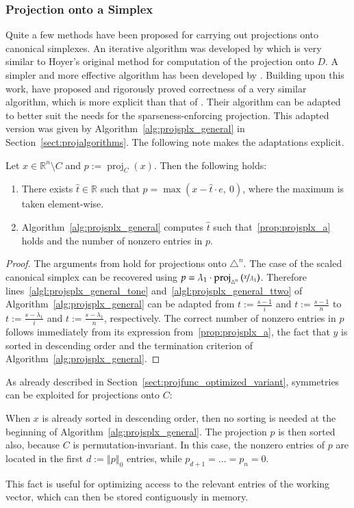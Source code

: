 \documentclass[twoside,11pt]{article}
\DeclareMathOperator{\proj}{proj}
\newcommand{\R}{\mathbb{R}}
\newcommand{\0}{\mathcal{O}}
\newcommand{\norm}[1]{\left\Vert#1\right\Vert}
\newcommand{\splx}{\triangle}
\begin{document}
\subsubsection{Projection onto a Simplex}
Quite a few methods have been proposed for carrying out projections onto canonical simplexes.
An iterative algorithm was developed by \cite{Michelot1986} which is very similar to Hoyer's original method for computation of the projection onto $D$.
A simpler and more effective algorithm has been developed by \cite{Duchi2008}.
Building upon this work, \cite{Chen2011} have proposed and rigorously proved correctness of a very similar algorithm, which is more explicit than that of \cite{Duchi2008}.
Their algorithm can be adapted to better suit the needs for the sparseness-enforcing projection.
This adapted version was given by Algorithm~\ref{alg:projsplx_general} in Section~\ref{sect:projalgorithms}.
The following note makes the adaptations explicit.
\begin{proposition}
\label{prop:projsplx}
Let $x\in\R^n\setminus C$ and $p := \proj_C(x)$.
Then the following holds:
\begin{enumerate}
\item \label{prop:projsplx_a}
There exists $\hat{t}\in\R$ such that $p = \max\left(x - \hat{t}\cdot e,\ 0\right)$, where the maximum is taken element-wise.
\item \label{prop:projsplx_b}
Algorithm~\ref{alg:projsplx_general} computes $\hat{t}$ such that~\ref{prop:projsplx_a} holds and the number of nonzero entries in $p$.
\end{enumerate}
\end{proposition}
\begin{proof}
The arguments from \cite{Chen2011} hold for projections onto $\splx^n$.
The case of the scaled canonical simplex can be recovered using $p = \lambda_1\cdot\proj_{\splx^n}\left(\nicefrac{x}{\lambda_1}\right)$.
Therefore lines~\ref{algl:projsplx_general_tone} and~\ref{algl:projsplx_general_ttwo} of Algorithm~\ref{alg:projsplx_general} can be adapted from $t := \frac{s - 1}{i}$ and $t := \frac{s - 1}{n}$ to $t := \frac{s - \lambda_1}{i}$ and $t := \frac{s - \lambda_1}{n}$, respectively.
The correct number of nonzero entries in $p$ follows immediately from its expression from~\ref{prop:projsplx_a}, the fact that $y$ is sorted in descending order and the termination criterion of Algorithm~\ref{alg:projsplx_general}.
\end{proof}
As already described in Section~\ref{sect:projfunc_optimized_variant}, symmetries can be exploited for projections onto $C$:
\begin{remark}
\label{rem:projsplx_sorting}
When $x$ is already sorted in descending order, then no sorting is needed at the beginning of Algorithm~\ref{alg:projsplx_general}.
The projection $p$ is then sorted also, because $C$ is permutation-invariant.
In this case, the nonzero entries of $p$ are located in the first $d := \norm{p}_0$ entries, while $p_{d+1}=\dots=p_n=0$.
\end{remark}
This fact is useful for optimizing access to the relevant entries of the working vector, which can then be stored contiguously in memory.
\end{document}
